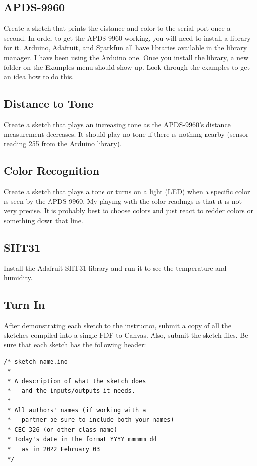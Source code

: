 \subsection{APDS-9960}
Create a sketch that prints the distance and color to the serial port once a second. In order to get the APDS-9960 working,
you will need to install a library for it. Arduino, Adafruit, and Sparkfun all have libraries available in the library 
manager. I have been using the Arduino one. Once you install the library, a new folder on the Examples menu should show up. 
Look through the examples to get an idea how to do this. 

\subsection{Distance to Tone}
Create a sketch that plays an increasing tone as the APDS-9960's distance measurement decreases. It should play 
no tone if there is nothing nearby (sensor reading 255 from the Arduino library). 

\subsection{Color Recognition}
Create a sketch that plays a tone or turns on a light (LED) when a specific color is seen by the APDS-9960. My playing with 
the color readings is that it is not very precise. It is probably best to choose colors and just react to redder colors or 
something down that line.

\subsection{SHT31}
Install the Adafruit SHT31 library and run it to see the temperature and humidity.


\subsection{Turn In}
After demonstrating each sketch to the instructor, submit a copy of all the sketches compiled into a single PDF to Canvas. Also, submit the sketch files. Be sure that each sketch has the following 
header:
\begin{lstlisting}
/* sketch_name.ino
 *
 * A description of what the sketch does 
 *   and the inputs/outputs it needs.
 *
 * All authors' names (if working with a 
 *   partner be sure to include both your names)
 * CEC 326 (or other class name)
 * Today's date in the format YYYY mmmmm dd 
 *   as in 2022 February 03
 */
\end{lstlisting}